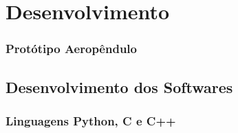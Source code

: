 \chapter{Desenvolvimento}
\label{cap_desenvolvimento}

%






%


\newpage

\subsection{Protótipo Aeropêndulo}




\section{Desenvolvimento dos Softwares}
\label{dev_softwares}


\subsection{Linguagens Python, C e C++}



